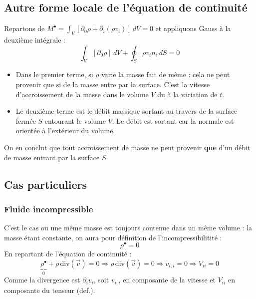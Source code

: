 \subsection{Autre forme locale de l'équation de continuité}
Repartons de $M^\bullet = \int_V [\partial_0\rho + \partial_i(\rho v_i)]\ dV = 0$ et 
appliquons Gauss à la deuxième intégrale :
\begin{equation}
\int_V [\partial_0\rho]\ dV + \oint_S \rho v_in_i\ dS = 0
\end{equation}
\begin{itemize}
\item Dans le premier terme, si $\rho$ varie la masse fait de même : cela ne peut 
provenir que si de la masse entre par la surface. C'est la vitesse d'accroissement de
la masse dans le volume $V$ du à la variation de $t$.
\item Le deuxième terme est le débit massique sortant au travers de la surface fermée 
$S$ entourant le volume $V$. Le débit est sortant car la normale est orientée à l'extérieur 
du volume.
\end{itemize}
On en conclut que tout accroissement de masse ne peut provenir \textbf{que} d'un débit
de masse entrant par la surface $S$.


\subsection{Cas particuliers}
    \subsubsection{Fluide incompressible}
    C'est le cas ou une même masse est toujours contenue dans un même volume : la 
    masse étant constante, on aura pour définition de l'incompressibilitité :
    \begin{equation}
    \rho^\bullet = 0
    \end{equation}
    En repartant de l'équation de continuité : 
    \begin{equation}
    \underbrace{\rho^\bullet}_{0} +\rho\,\text{div}(\vec v) = 0 \Rightarrow
    \rho\,\text{div}(\vec v) = 0 \Rightarrow v_{i,i} = 0 \Rightarrow V_{ii} = 0
    \end{equation}
    Comme la divergence est $\partial_i v_i$, soit $v_{i,i}$ en composante de la vitesse et
    $V_{ii}$ en composante du tenseur (def.).
    
    

